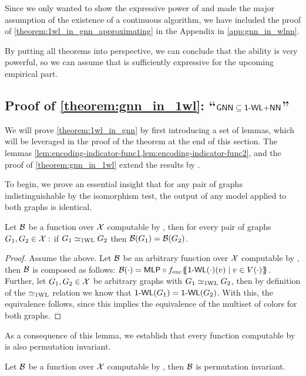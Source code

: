 Since we only wanted to show the expressive power of \wldisc and made the major assumption of the existence of a continuous \wl algorithm, we have included the proof of \cref{theorem:1wl_in_gnn_approximating} in the Appendix in \cref{app:gnn_in_wlnn}.

By putting all theorems into perspective, we can conclude that the ability \wldisc is very powerful, so we can assume that \wlnn is sufficiently expressive for the upcoming empirical part. 






\subsection{Proof of \cref*{theorem:gnn_in_1wl}: ``$\textsf{GNN} \subseteq \text{\textsf{1-WL+NN}}$''}\label{sec:proof_theorem:1wl_in_gnn}
We will prove \cref{theorem:1wl_in_gnn} by first introducing a set of lemmas, which will be leveraged in the proof of the theorem at the end of this section. The lemmas \cref{lem:encoding-indicator-func1,lem:encoding-indicator-func2}, and the proof of \cref{theorem:gnn_in_1wl} extend the results by \cite{Chen2019}.

To begin, we prove an essential insight that for any pair of graphs indistinguishable by the \wl isomorphism test, the output of any \wlnn model applied to both graphs is identical.
\begin{lemma}\label{lem:wl_relation_equivalence}
    Let $\mathcal{B}$ be a function over $\mathcal{X}$ computable by \wlnn, then for every pair of graphs $G_1, G_2 \in \mathcal{X}:$ if $G_1 \simeq_{\text{1WL}} G_2$ then $\mathcal{B}(G_1) = \mathcal{B}(G_2)$.
\end{lemma}
\begin{proof}
    Assume the above. Let $\mathcal{B}$ be an arbitrary function over $\mathcal{X}$ computable by \wlnn, then $\mathcal{B}$ is composed as follows: $\mathcal{B}(\cdot) = \textsf{MLP} \circ f_{\text{enc}} \{\!\!\{ \textsf{1-WL}(\cdot)(v) \mid v \in V(\cdot) \}\!\!\}$. Further, let $G_1, G_2 \in \mathcal{X}$ be arbitrary graphs with $G_1 \simeq_{\text{1WL}} G_2$, then by definition of the $\simeq_{\text{1WL}}$ relation we know that $\textsf{1-WL}(G_1) = \textsf{1-WL}(G_2)$. With this, the equivalence follows, since this implies the equivalence of the multiset of colors for both graphs.
\end{proof}

As a consequence of this lemma, we establish that every function computable by \wlnn is also permutation invariant.
\begin{corollary}\label{lem:wlnn_permutation_invariance}
    Let $\mathcal{B}$ be a function over $\mathcal{X}$ computable by \wlnn, then $\mathcal{B}$ is permutation invariant.
\end{corollary}

